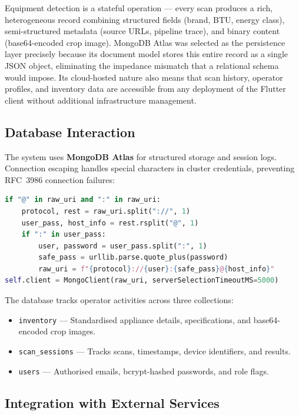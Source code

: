 Equipment detection is a stateful operation — every scan produces a rich, heterogeneous record combining structured fields (brand, BTU, energy class), semi-structured metadata (source URLs, pipeline trace), and binary content (base64-encoded crop image). MongoDB Atlas was selected as the persistence layer precisely because its document model stores this entire record as a single JSON object, eliminating the impedance mismatch that a relational schema would impose. Its cloud-hosted nature also means that scan history, operator profiles, and inventory data are accessible from any deployment of the Flutter client without additional infrastructure management.

\subsection{Database Interaction}

The system uses \textbf{MongoDB Atlas} for structured storage and session logs. Connection escaping handles special characters in cluster credentials, preventing RFC~3986 connection failures:

\begin{lstlisting}[language=Python, caption={MongoDB URI credential escaping}]
if "@" in raw_uri and ":" in raw_uri:
    protocol, rest = raw_uri.split("://", 1)
    user_pass, host_info = rest.rsplit("@", 1)
    if ":" in user_pass:
        user, password = user_pass.split(":", 1)
        safe_pass = urllib.parse.quote_plus(password)
        raw_uri = f"{protocol}://{user}:{safe_pass}@{host_info}"
self.client = MongoClient(raw_uri, serverSelectionTimeoutMS=5000)
\end{lstlisting}

The database tracks operator activities across three collections:
\begin{itemize}
  \item \texttt{inventory} — Standardised appliance details, specifications, and base64-encoded crop images.
  \item \texttt{scan\_sessions} — Tracks scans, timestamps, device identifiers, and results.
  \item \texttt{users} — Authorised emails, bcrypt-hashed passwords, and role flags.
\end{itemize}

\subsection{Integration with External Services}

